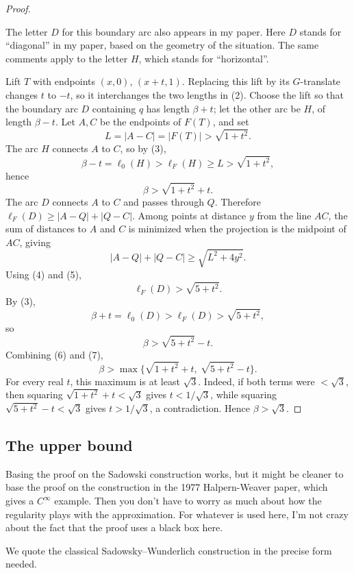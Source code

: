 \documentclass[12pt]{article}
\theoremstyle{plain}
\newcommand{\review}[1]{\begin{reviewbox}#1\end{reviewbox}}
\begin{document}
\begin{proof}
\review{The letter $D$ for this boundary arc also appears in my paper. Here $D$ stands for ``diagonal'' in my paper, based on the geometry of the situation. The same comments apply to the letter $H$, which stands for ``horizontal''. }

Lift \(T\) with endpoints \((x,0)\), \((x+t,1)\).  Replacing this lift by its
\(G\)-translate changes \(t\) to \(-t\), so it interchanges the two lengths in
(2).  Choose the lift so that the boundary arc \(D\) containing \(q\) has
length \(\beta+t\); let the other arc be \(H\), of length \(\beta-t\).  Let
\(A,C\) be the endpoints of \(F(T)\), and set
\[
L=|A-C|=|F(T)|>\sqrt{1+t^2}. \tag{5}
\]
The arc \(H\) connects \(A\) to \(C\), so by (3),
\[
\beta-t=\ell_0(H)>\ell_F(H)\ge L>\sqrt{1+t^2},
\]
hence
\[
\beta>\sqrt{1+t^2}+t. \tag{6}
\]
The arc \(D\) connects \(A\) to \(C\) and passes through \(Q\).  Therefore
\(\ell_F(D)\ge |A-Q|+|Q-C|\).  Among points at distance \(y\) from the line
\(AC\), the sum of distances to \(A\) and \(C\) is minimized when the
projection is the midpoint of \(AC\), giving
\[
|A-Q|+|Q-C|\ge \sqrt{L^2+4y^2}.
\]
Using (4) and (5),
\[
\ell_F(D)>\sqrt{5+t^2}.
\]
By (3),
\[
\beta+t=\ell_0(D)>\ell_F(D)>\sqrt{5+t^2},
\]
so
\[
\beta>\sqrt{5+t^2}-t. \tag{7}
\]
Combining (6) and (7),
\[
\beta>
\max\{\sqrt{1+t^2}+t,\ \sqrt{5+t^2}-t\}.
\]
For every real \(t\), this maximum is at least \(\sqrt3\).  Indeed, if both
terms were \(<\sqrt3\), then squaring
\(\sqrt{1+t^2}+t<\sqrt3\) gives \(t<1/\sqrt3\), while squaring
\(\sqrt{5+t^2}-t<\sqrt3\) gives \(t>1/\sqrt3\), a contradiction.  Hence
\(\beta>\sqrt3\).
\end{proof}




\subsection{The upper bound}



\review{Basing the proof on the Sadowski construction works, but it might be cleaner to base the proof on the construction in the 1977 Halpern-Weaver paper, which gives a $C^{\infty}$ example.  Then you don't have to worry as much about how the regularity plays with the approximation.   For whatever is used here, I'm not crazy about the fact that the proof uses a black box here.}

We quote the classical Sadowsky--Wunderlich construction in the precise form
needed.
\end{document}
